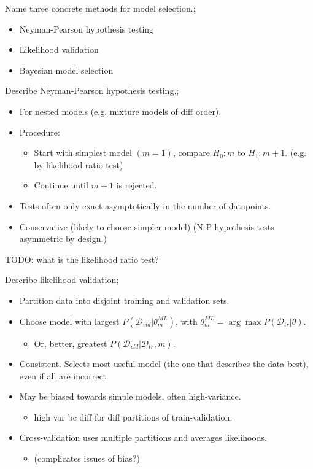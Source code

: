 \documentclass{article}
\begin{document}
Name three concrete methods for model selection.; \begin{itemize}
    \item Neyman-Pearson hypothesis testing
    \item Likelihood validation
    \item Bayesian model selection
\end{itemize}

Describe Neyman-Pearson hypothesis testing.; \begin{itemize}
    \item For nested models (e.g. mixture models of diff order). 
    \item Procedure: \begin{itemize}
        \item Start with simplest model $(m=1)$, compare $H_0: m$ to $H_1: m+1$. (e.g. by likelihood ratio test)
        \item Continue until $m+1$ is rejected.
    \end{itemize}
    \item Tests often only exact asymptotically in the number of datapoints.
    \item Conservative (likely to choose simpler model) (N-P hypothesis tests asymmetric by design.)
\end{itemize}

TODO: what is the likelihood ratio test?

Describe likelihood validation; \begin{itemize}
    \item Partition data into disjoint training and validation sets.
    \item Choose model with largest $P(\mathcal{D}_{vld}|\theta_m^{ML})$, with $\theta_m^{ML}=\arg\max P(\mathcal{D}_{tr}|\theta)$.
    \begin{itemize}
        \item Or, better, greatest $P(\mathcal{D}_{vld}|\mathcal{D}_{tr},m)$.
    \end{itemize}
    \item Consistent. Selects most useful model (the one that describes the data best), even if all are incorrect.
    \item May be biased towards simple models, often high-variance.
    \begin{itemize}
        \item high var bc diff for diff partitions of train-validation.
    \end{itemize}
    \item Cross-validation uses multiple partitions and averages likelihoods. \begin{itemize}
        \item (complicates issues of bias?)
    \end{itemize}
\end{itemize}
\end{document}

